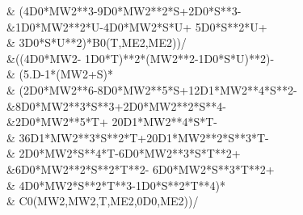 {	\multsp \multsp \multsp \multsp \multsp \&\multsp \multsp \multsp \multsp
    \multsp (4D0*MW2**3\multsp -\multsp 9D0*MW2**2*S\multsp +\multsp 2D0*S**3\multsp -\multsp  \\
	\multsp \multsp \multsp \multsp
    \multsp \&\multsp \multsp \multsp \multsp \multsp \multsp \multsp 1D0*MW2**2*U\multsp -\multsp 4D0*MW2*S*U\multsp +\multsp
    5D0*S**2*U\multsp +\multsp  \\
	\multsp \multsp \multsp \multsp \multsp \&\multsp \multsp \multsp \multsp \multsp \multsp \multsp
    3D0*S*U**2)*B0(T,ME2,ME2))/ \\
	\multsp \multsp \multsp \multsp \multsp \&\multsp \multsp \multsp ((4D0*MW2\multsp -\multsp
    1D0*T)**2*(MW2**2\multsp -\multsp 1D0*S*U)**2)\multsp -\multsp  \\
	\multsp \multsp \multsp \multsp \multsp \&\multsp \multsp
    (5.D-1*(MW2\multsp +\multsp S)* \\
	\multsp \multsp \multsp \multsp \multsp \&\multsp \multsp \multsp \multsp \multsp
    (2D0*MW2**6\multsp -\multsp 8D0*MW2**5*S\multsp +\multsp 12D1*MW2**4*S**2\multsp -\multsp  \\
	\multsp \multsp \multsp \multsp
    \multsp \&\multsp \multsp \multsp \multsp \multsp \multsp \multsp 8D0*MW2**3*S**3\multsp +\multsp 2D0*MW2**2*S**4\multsp -\multsp  \\
    	\multsp \multsp \multsp \multsp \multsp \&\multsp \multsp \multsp \multsp \multsp \multsp \multsp 2D0*MW2**5*T\multsp +\multsp
    20D1*MW2**4*S*T\multsp -\multsp  \\
	\multsp \multsp \multsp \multsp \multsp \&\multsp \multsp \multsp \multsp \multsp \multsp
    \multsp 36D1*MW2**3*S**2*T\multsp +\multsp 20D1*MW2**2*S**3*T\multsp -\multsp  \\
	\multsp \multsp \multsp \multsp \multsp \&\multsp
    \multsp \multsp \multsp \multsp \multsp \multsp 2D0*MW2*S**4*T\multsp -\multsp 6D0*MW2**3*S*T**2\multsp +\multsp  \\
	\multsp \multsp
    \multsp \multsp \multsp \&\multsp \multsp \multsp \multsp \multsp \multsp \multsp 6D0*MW2**2*S**2*T**2\multsp -\multsp
    6D0*MW2*S**3*T**2\multsp +\multsp  \\
	\multsp \multsp \multsp \multsp \multsp \&\multsp \multsp \multsp \multsp \multsp \multsp
    \multsp 4D0*MW2*S**2*T**3\multsp -\multsp 1D0*S**2*T**4)* \\
	\multsp \multsp \multsp \multsp \multsp \&\multsp \multsp \multsp
    \multsp \multsp C0(MW2,MW2,T,ME2,0D0,ME2))/ \\
}
